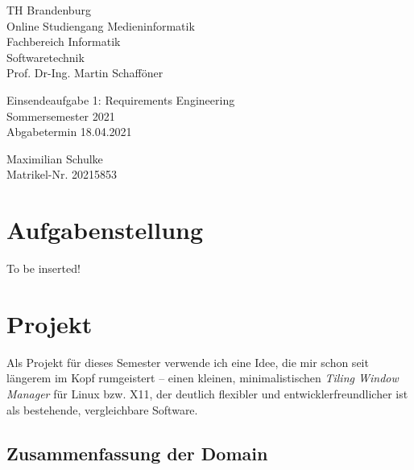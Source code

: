 \documentclass{article}
\begin{document}
\begin{titlepage}
	\begin{flushleft}
		TH Brandenburg \\
		Online Studiengang Medieninformatik \\
		Fachbereich Informatik \\
		Softwaretechnik \\
		Prof. Dr-Ing. Martin Schafföner
	\end{flushleft}

	\vfill

	\begin{center}
		\Large{Einsendeaufgabe 1: Requirements Engineering}\\[0.5em]
		\large{Sommersemester 2021}\\[0.25em]
		\large{Abgabetermin 18.04.2021}
	\end{center}

	\vfill

	\begin{flushright}
		Maximilian Schulke \\
		Matrikel-Nr. 20215853
	\end{flushright}
\end{titlepage}

\tableofcontents

\newpage

\section{Aufgabenstellung}


\vspace{100px}
\begin{center}
	\large{To be inserted!}
\end{center}
\vspace{100px}

\section{Projekt}

Als Projekt für dieses Semester verwende ich eine Idee, die mir schon seit längerem im Kopf rumgeistert
– einen kleinen, minimalistischen \emph{Tiling Window Manager} für Linux bzw. X11, der deutlich flexibler
und entwicklerfreundlicher ist als bestehende, vergleichbare Software.

\subsection{Zusammenfassung der Domain}
\end{document}
